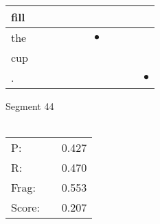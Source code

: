 \documentclass[landscape]{article}
\newcommand{\ssp}{\hspace{2pt}}
\newcommand{\mex}{\cellcolor{g}$\bullet$}
\begin{document}
\begin{tabular}{|l|p{10pt}|p{10pt}|p{10pt}|p{10pt}|p{10pt}|p{10pt}|p{10pt}|p{10pt}|p{10pt}|p{10pt}|}
\hline
\ssp fill \ssp&\hspace{2pt}&\hspace{2pt}&\hspace{2pt}&\hspace{2pt}&\hspace{2pt}&\hspace{2pt}&\hspace{2pt}&\hspace{2pt}&\hspace{2pt}&\hspace{2pt}\\
\hline
\ssp \cellcolor{ref5}the \ssp&\hspace{2pt}&\hspace{2pt}&\hspace{2pt}&\hspace{2pt}&\hspace{2pt}&\hspace{2pt}\mex&\hspace{2pt}&\hspace{2pt}&\hspace{2pt}&\hspace{2pt}\\
\hline
\ssp cup \ssp&\hspace{2pt}&\hspace{2pt}&\hspace{2pt}&\hspace{2pt}&\hspace{2pt}&\hspace{2pt}&\hspace{2pt}&\hspace{2pt}&\hspace{2pt}&\hspace{2pt}\\
\hline
\ssp \cellcolor{ref9}. \ssp&\hspace{2pt}&\hspace{2pt}&\hspace{2pt}&\hspace{2pt}&\hspace{2pt}&\hspace{2pt}&\hspace{2pt}&\hspace{2pt}&\hspace{2pt}&\hspace{2pt}\mex\\
\hline
\end{tabular}

\vspace{6pt}
\noindent Segment 44\\\\
\noindent\begin{tabular}{lm{12pt}r}
\hline
P:&&0.427\\
R:&&0.470\\
Frag:&&0.553\\
Score:&&0.207\\
\end{tabular}
\end{document}

